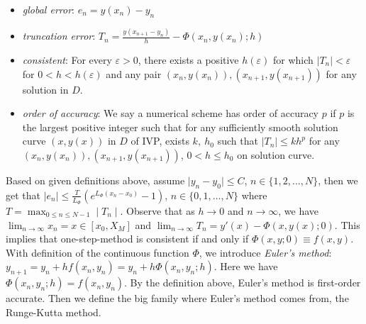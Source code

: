 \documentclass[
11pt, %
a4paper, %
oneside, %
headinclude,footinclude, %
BCOR5mm, %
]{scrartcl}
\begin{document}
\begin{itemize}
    \item \textit{global error}: $e_n=y(x_n)-y_n$
    \item \textit{truncation error}: $T_n=\frac{y(x_{n+1}-y_n)}{h}-\Phi(x_n,y(x_n);h)$
    \item \textit{consistent}: For every $\varepsilon >0$, there exists a positive $h(\varepsilon)$ for which $\mid T_n \mid <\varepsilon$ for $0<h<h(\varepsilon)$ and any pair $(x_n,y(x_n)), (x_{n+1},y(x_{n+1}))$ for any solution in $D$.
    \item \textit{order of accuracy}: We say a numerical scheme has order of accuracy $p$ if $p$ is the largest positive integer such that for any sufficiently smooth solution curve $(x,y(x))$ in $D$ of IVP, exists $k, \ h_0$ such that $\mid T_n\mid \leq kh^p$ for any $(x_n, y(x_n)), (x_{n+1},y(x_{n+1}))$, $0<h\leq h_0$ on solution curve. 
\end{itemize}
Based on given definitions above, assume $\mid y_n-y_0\mid \leq C$, $n \in \{1,2,...,N\}$, then we get that $\mid e_n\mid \leq \frac{T}{L_{\Phi}}(e^{L_{\Phi}(x_n-x_0)}-1)$, $n \in \{0,1,...,N\}$ where $T=\max_{0\leq n\leq N-1} \mid T_n\mid $. Observe that as $h\rightarrow0$ and $n\rightarrow\infty$, we have $\lim_{n\rightarrow\infty}x_n=x\in [x_0,X_M]$ and $\lim_{n\rightarrow\infty}T_n=y'(x)-\Phi(x,y(x);0)$. This implies that one-step-method is consistent if and only if $\Phi(x,y;0)\equiv f(x,y)$.
\vspace{0.6em}\\With definition of the continuous function $\Phi$, we introduce \textit{Euler's method}: $y_{n+1}=y_n+hf(x_n, y_n)=y_n+h\Phi(x_n,y_n;h)$. Here we have $\Phi(x_n,y_n;h)=f(x_n,y_n)$. By the definition above, Euler's method is first-order accurate. Then we define the big family where Euler's method comes from, the Runge-Kutta method. 
\end{document}
